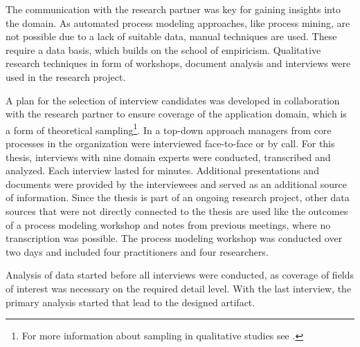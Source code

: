 	The communication with the research partner was key for gaining insights into the domain. As automated process modeling approaches, like process mining, are not possible due to a lack of suitable data, manual techniques are used. These require a data basis, which builds on the school of empiricism. Qualitative research techniques in form of workshops, document analysis and interviews were used in the research project. 
	
	A plan for the selection of interview candidates was developed in collaboration with the research partner to ensure coverage of the application domain, which is a form of theoretical sampling\footnote{For more information about sampling in qualitative studies see \citep{coyne1997sampling}.}. In a top-down approach managers from core processes in the organization were interviewed face-to-face or by call. For this thesis, interviews with nine domain experts were conducted, transcribed and analyzed. Each interview lasted for  minutes. Additional presentations and documents were provided by the interviewees and served as an additional source of information. Since the thesis is part of an ongoing research project, other data sources that were not directly connected to the thesis are used like the outcomes of a process modeling workshop and notes from previous meetings, where no transcription was possible. The process modeling workshop was conducted over two days and included four practitioners and four researchers. 
	
	Analysis of data started before all interviews were conducted, as coverage of fields of interest was necessary on the required detail level. With the last interview, the primary analysis started that lead to the designed artifact.
	
	
	

